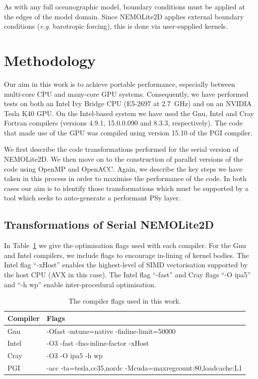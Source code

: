 \documentclass[gmdd, manuscript]{copernicus}
\begin{document}
As with any full oceanographic model, boundary conditions must be
applied at the edges of the model domain. Since NEMOLite2D applies
external boundary conditions (\textit{e.g.} barotropic forcing), this is
done via user-supplied kernels.


\section{Methodology}
\label{sec_methodology}

Our aim in this work is to achieve portable performance, especially
between multi-core CPU and many-core GPU systems. Consequently, we
have performed tests on both an Intel Ivy Bridge CPU (E5-2697 at
2.7~GHz) and on an NVIDIA Tesla K40 GPU.  On the Intel-based system we
have used the Gnu, Intel and Cray Fortran compilers (versions 4.9.1,
15.0.0.090 and 8.3.3, respectively). The code that made use of the GPU
was compiled using version 15.10 of the PGI compiler.

We first describe the code transformations performed for the serial
version of NEMOLite2D.  We then move on to the construction of
parallel versions of the code using OpenMP and OpenACC. Again, we
describe the key steps we have taken in this process in order to
maximise the performance of the code. In both cases our aim is to
identify those transformations which must be supported by a tool
which seeks to auto-generate a performant PSy layer.

\subsection{Transformations of Serial NEMOLite2D}

In Table~\ref{TABLE_compiler_flags} we give the optimisation flags
used with each compiler. For the Gnu and Intel compilers, we
include flags to encourage in-lining of kernel bodies. The Intel flag
``-xHost'' enables the highest-level of SIMD vectorisation supported
by the host CPU (AVX in this case). The Intel flag ``-fast'' and Cray
flags ``-O ipa5'' and ``-h wp'' enable inter-procedural optimisation.

\begin{table}[!t]
\caption{The compiler flags used in this work.}
\label{TABLE_compiler_flags}
\centering
\begin{tabular}{l|l}
\hline
Compiler  &  Flags                                                       \\
\hline
Gnu       & -Ofast -mtune=native -finline-limit=50000                    \\
Intel     & -O3 -fast -fno-inline-factor -xHost                          \\
Cray      & -O3 -O ipa5 -h wp                                            \\
PGI       & -acc -ta=tesla,cc35,nordc -Mcuda=maxregcount:80,loadcache:L1 \\
\hline
\end{tabular}
\end{table}
\end{document}
